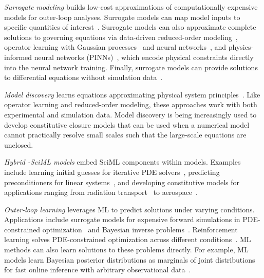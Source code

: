 \emph{Surrogate modeling} builds low-cost approximations of computationally expensive models for outer-loop analyses. 
Surrogate models can map model inputs to specific quantities of interest~\cite{Doostan_VI_CMAME_2013, Tezaur_PPJR_JAMES_2022, bouhlel2020scalable}.
Surrogate models can also approximate complete solutions to governing equations via data-driven reduced-order modeling~\cite{Peherstorfer_W_CMAME_2016, Schmid_JFM_2010, Brunton_PK_PNAS_2016}, operator learning with Gaussian processes~\cite{mora2024operator} and neural networks~\cite{HesthavenUbbiali18,kovachki2023neural, Lu_JPZK_NMI_2021, bhattacharya2021model, Li_KBALBSA_icml_2021,o2024derivative,fresca2022pod}, and physics-informed neural networks (PINNs)~\cite{yu2018deep,Raissi_PK_JCP_2019,goswami2023physics}, which encode physical constraints directly into the neural network training.
Finally, surrogate models can provide solutions to differential equations without simulation data~\cite{Sirignano_S_JCP_2018, W_B_CMS_2018}.

\emph{Model discovery} learns equations approximating physical system principles~\cite{Schmid_JFM_2010,Brunton_PK_PNAS_2016,Ling_JT_JCP_2016,Cory_CDEL_NC_2024}. Like operator learning and reduced-order modeling, these approaches work with both experimental and simulation data. Model discovery is being increasingly used to develop constitutive closure models that can be used when a numerical model cannot practically resolve small scales such that the large-scale equations are unclosed.

\emph{Hybrid \CSE{}-SciML models} embed SciML components within \CSE{} models.
Examples include learning initial guesses for iterative PDE solvers~\cite{huang2020int}, predicting preconditioners for linear systems~\cite{sappl2019deep}, and developing constitutive models for applications ranging from radiation transport~\cite{Huang_YCRY_MMS_2023} to aerospace~\cite{Singh_MD_AIAA_2017}.

\emph{Outer-loop learning} leverages ML to predict solutions under varying conditions.
Applications include surrogate models for expensive forward simulations in PDE-constrained optimization~\cite{wang2021fast,luo2023efficient} and Bayesian inverse problems~\cite{cao2024lazy}.
Reinforcement learning solves PDE-constrained optimization across different conditions~\cite{sutton2018reinforcement}.
ML methods can also learn solutions to these problems directly.
For example, ML models learn Bayesian posterior distributions as marginals of joint distributions for fast online inference with arbitrary observational data~\cite{baptista2020conditional,baptista2023representation,weilbach2020structured}.


